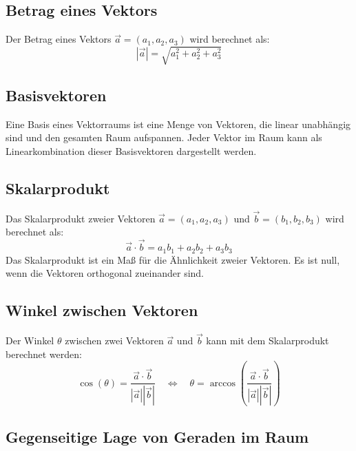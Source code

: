 \documentclass{article}
\begin{document}
\begin{minipage}[t]{0.45\textwidth}
    \subsection*{Betrag eines Vektors}
    Der Betrag eines Vektors \( \vec{a} = (a_1, a_2, a_3) \) wird berechnet als:
    \begin{equation*}
        |\vec{a}| = \sqrt{a_1^2 + a_2^2 + a_3^2}
    \end{equation*}


    \subsection*{Basisvektoren}
    Eine Basis eines Vektorraums ist eine Menge von Vektoren, die linear unabhängig sind und den gesamten Raum aufspannen. Jeder Vektor im Raum kann als Linearkombination dieser Basisvektoren dargestellt werden.
    
    \subsection*{Skalarprodukt}
    Das Skalarprodukt zweier Vektoren \( \vec{a} = (a_1, a_2, a_3) \) und \( \vec{b} = (b_1, b_2, b_3) \) wird berechnet als:
    \begin{equation*}
        \vec{a} \cdot \vec{b} = a_1 b_1 + a_2 b_2 + a_3 b_3
    \end{equation*}
    Das Skalarprodukt ist ein Maß für die Ähnlichkeit zweier Vektoren. Es ist null, wenn die Vektoren orthogonal zueinander sind.
    \subsection*{Winkel zwischen Vektoren}
    Der Winkel \( \theta \) zwischen zwei Vektoren \( \vec{a} \) und \( \vec{b} \) kann mit dem Skalarprodukt berechnet werden:
    \begin{equation*}
        \cos(\theta) = \frac{\vec{a} \cdot \vec{b}}{|\vec{a}| |\vec{b}|} 
        \quad \Leftrightarrow \quad 
        \theta = \arccos\left(\frac{\vec{a} \cdot \vec{b}}{|\vec{a}| |\vec{b}|}\right) 
    \end{equation*}

    \subsection*{Gegenseitige Lage von Geraden im Raum}
    \begin{center}
    \end{center}

\end{minipage}
\end{document}
